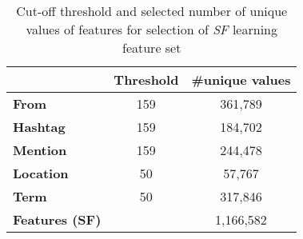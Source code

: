 \begin{table}[!h]
\centering
{\renewcommand{\arraystretch}{1.2}
\begin{tabular}{|l|c|c|}
\hline
 & \textbf{Threshold} & \textbf{\#unique values} \\ \hline
\textbf{From} & 159 & 361,789 \\ \hline
\textbf{Hashtag} & 159 & 184,702 \\ \hline
\textbf{Mention} & 159 & 244,478 \\ \hline
\textbf{Location} & 50 & 57,767 \\ \hline
\textbf{Term} & 50 & 317,846 \\ \hline
\textbf{Features (SF)} &  & 1,166,582 \\ \hline
\end{tabular}
}
\caption{Cut-off threshold and selected number of unique values of features for selection of \textit{SF} learning feature set}
\label{table:learningFeatures}
\end{table}


